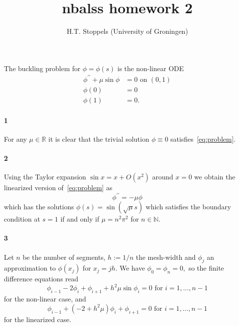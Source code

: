 \documentclass[a4paper]{article}
\author{H.T. Stoppels (University of Groningen)}
\title{{\sc nbalss} homework 2}
\begin{document}
  \maketitle
  
  The buckling problem for $\phi = \phi(s)$ is the non-linear ODE
  \begin{equation}\label{eq:problem}
  \begin{aligned}
    \phi^{\prime\prime} + \mu \sin \phi &= 0 \text{ on } (0, 1) \\
    \phi(0) &= 0 \\
    \phi(1) &= 0.
  \end{aligned}
  \end{equation}

  \paragraph{1} For any $\mu \in \mathbb{R}$ it is clear that the trivial solution $\phi \equiv 0$ satisfies~\eqref{eq:problem}.

  \paragraph{2} Using the Taylor expansion $\sin x = x + O(x^2)$ around $x = 0$ we obtain the linearized version of~\eqref{eq:problem} as $$\phi^{\prime\prime} = - \mu \phi$$
  which has the solutions $\phi(s) = \sin(\sqrt{\mu}s)$ which satisfies the boundary condition at $s = 1$ if and only if $\mu = n^2\pi^2$ for $n \in \mathbb{N}.$

  \paragraph{3} Let $n$ be the number of segments, $h := 1 / n$ the mesh-width and $\phi_j$ an approximation to $\phi(x_j)$ for $x_j = jh.$ We have $\phi_0 = \phi_n = 0,$ so the finite difference equations read
  \begin{equation}
    \phi_{i-1} - 2 \phi_i + \phi_{i + 1} + h^2 \mu \sin \phi_i = 0 \text{ for } i = 1, \dots, n - 1
  \end{equation}
  for the non-linear case, and
  \begin{equation}
    \phi_{i-1} + (-2 + h^2 \mu)\phi_i + \phi_{i + 1} = 0 \text{ for } i = 1, \dots, n - 1
  \end{equation}
  for the linearized case.
\end{document}
